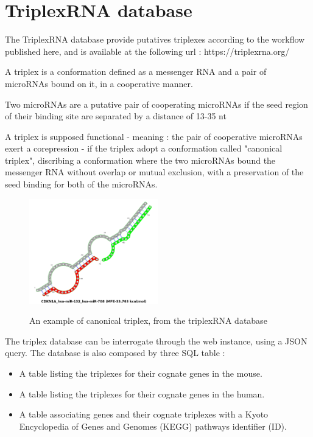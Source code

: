\documentclass[a4paper,12pt]{report}
\begin{document}
\section{TriplexRNA database}

The TriplexRNA database provide putatives triplexes according to the workflow published here\cite{triplex}, and is available at the following url : https://triplexrna.org/

A triplex is a conformation defined as a messenger RNA and a pair of microRNAs bound on it, in a cooperative manner. 

Two microRNAs are a putative pair of cooperating microRNAs if the seed region of their binding site are separated by a distance of 13-35 nt \cite{coop}

A triplex is supposed functional - meaning : the pair of cooperative microRNAs exert a corepression - if the triplex adopt a conformation called "canonical triplex", discribing a conformation where the two microRNAs bound the messenger RNA without overlap or mutual exclusion, with a preservation of the seed binding for both of the microRNAs.

\begin{figure}[H]
	\centering
	{\includegraphics[width=0.5\textwidth]{canonical.png}}
	\caption{An example of canonical triplex, from the triplexRNA database}
\end{figure}

The triplex database can be interrogate through the web instance, using a JSON query. The database is also composed by three SQL table :

\begin{itemize}
	\item A table listing the triplexes for their cognate genes in the mouse. 
	\item A table listing the triplexes for their cognate genes in the human.
	\item A table associating genes and their cognate triplexes with a Kyoto Encyclopedia of Genes and Genomes (KEGG) pathways identifier (ID)\cite{KEGG}.
\end{itemize}
\end{document}
